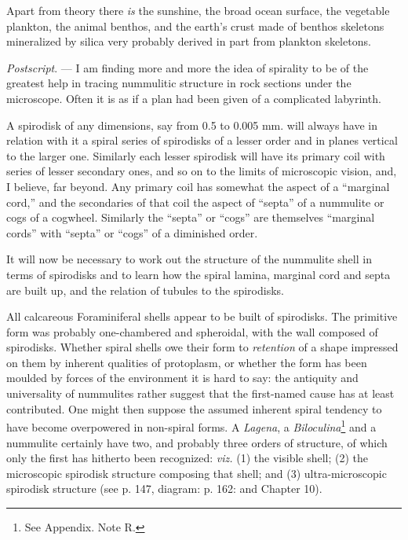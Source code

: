 \documentclass[a4paper, 12pt, oneside, landscape]{article}
\begin{document}
Apart from theory there \emph{is} the sunshine, the broad ocean surface, the vegetable plankton, the animal benthos, and the earth's crust made of benthos skeletons mineralized by silica very probably derived in part from plankton skeletons.

\emph{Postscript}. --- I am finding more and more the idea of spirality to be of the greatest help in tracing nummulitic structure in rock sections under the microscope. Often it is as if a plan had been given of a complicated labyrinth.

A spirodisk of any dimensions, say from 0.5 to 0.005 mm. will always have in relation with it a spiral series of spirodisks of a lesser order and in planes vertical to the larger one. Similarly each lesser spirodisk will have its primary coil with series of lesser secondary ones, and so on to the limits of microscopic vision, and, I believe, far beyond. Any primary coil has somewhat the aspect of a ``marginal cord,'' and the secondaries of that coil the aspect of ``septa'' of a nummulite or cogs of a cogwheel. Similarly the ``septa'' or ``cogs'' are themselves ``marginal cords'' with ``septa'' or ``cogs'' of a diminished order.

It will now be necessary to work out the structure of the nummulite shell in terms of spirodisks and to learn how the spiral lamina, marginal cord and septa are built up, and the relation of tubules to the spirodisks.

All calcareous Foraminiferal shells appear to be built of spirodisks. The primitive form was probably one-chambered and spheroidal, with the wall composed of spirodisks. Whether spiral shells owe their form to \emph{retention} of a shape impressed on them by inherent qualities of protoplasm, or whether the form has been moulded by forces of the environment it is hard to say: the antiquity and universality of nummulites rather suggest that the first-named cause has at least contributed. One might then suppose the assumed inherent spiral tendency to have become overpowered in non-spiral forms. A \emph{Lagena}, a \emph{Biloculina}\footnote{See Appendix. Note R.} and a nummulite certainly have two, and probably three orders of structure, of which only the first has hitherto been recognized: \emph{viz.} (1) the visible shell; (2) the microscopic spirodisk structure composing that shell; and (3) ultra-microscopic spirodisk structure (see p. 147, diagram: p. 162: and Chapter 10).
\clearpage
\end{document}
